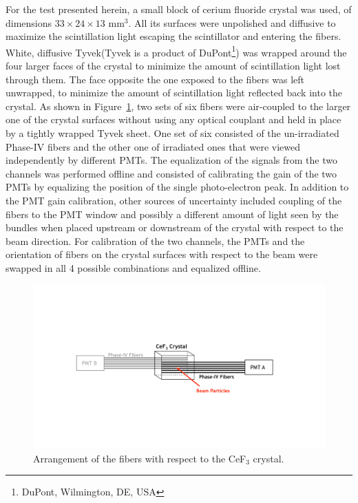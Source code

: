 \documentclass[a4paper,11pt]{article}
\begin{document}
For the test presented herein, a small block of cerium fluoride crystal was used, of dimensions $33\times 24 \times13$ mm$^3$. All its surfaces were unpolished and diffusive to maximize the scintillation light escaping the scintillator and entering the fibers. White, diffusive Tyvek\texttrademark (Tyvek is a product of DuPont\footnote{DuPont, Wilmington, DE, USA}) was wrapped around the four larger faces of the crystal to minimize the amount of scintillation light lost through them. The face opposite the one exposed to the fibers was left unwrapped, to minimize the amount of scintillation light reflected back into the crystal.  As shown in Figure~\ref{fig:CeF3Arrangement}, two sets of six fibers were air-coupled to the larger one of the crystal surfaces without using any optical couplant and held in place by a tightly wrapped Tyvek sheet. One set of six consisted of the un-irradiated Phase-IV fibers and the other one of irradiated ones that were viewed independently by different PMTs. The equalization of the signals from the two channels was performed offline and consisted of calibrating the gain of the two PMTs by equalizing the position of the single photo-electron peak. In addition to the PMT gain calibration, other sources of uncertainty included coupling of the fibers to the PMT window and possibly a different amount of light seen by the bundles when placed upstream or downstream of the crystal with respect to the beam direction. For calibration of the two channels, the PMTs and the orientation of fibers on the crystal surfaces with respect to the beam were swapped in all 4 possible combinations and equalized offline.
\begin{figure}[ht]
\begin{center}\vspace{-1pc}
      \includegraphics[width=14 cm]{Figures/CeF3Arrangement.pdf}
\caption{\small Arrangement of the fibers with respect to the CeF$_3$ crystal.}
    \label{fig:CeF3Arrangement}
\end{center}
\end{figure}
\end{document}
